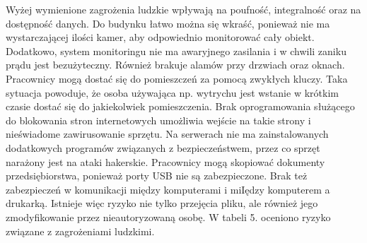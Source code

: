 Wyżej wymienione zagrożenia ludzkie wpływają na poufność, integralność oraz na dostępność danych. Do budynku łatwo można się wkraść, ponieważ nie ma wystarczającej ilości kamer, aby odpowiednio monitorować cały obiekt. Dodatkowo, system monitoringu nie ma awaryjnego zasilania i w chwili zaniku prądu jest bezużyteczny. Również brakuje alamów przy drzwiach oraz oknach. Pracownicy mogą dostać się do pomieszczeń za pomocą zwykłych kluczy. Taka sytuacja powoduje, że osoba używająca np. wytrychu jest wstanie w krótkim czasie dostać się do jakiekolwiek pomieszczenia. Brak oprogramowania służącego do blokowania stron internetowych umożliwia wejście na takie strony i nieświadome zawirusowanie sprzętu. Na serwerach nie ma zainstalowanych dodatkowych programów związanych z bezpieczeństwem, przez co sprzęt narażony jest na ataki hakerskie. Pracownicy mogą skopiować dokumenty przedsiębiorstwa, ponieważ porty USB nie są zabezpieczone. Brak też zabezpieczeń w komunikacji między komputerami i miIędzy komputerem a drukarką. Istnieje więc ryzyko nie tylko przejęcia pliku, ale również jego zmodyfikowanie przez nieautoryzowaną osobę.
W tabeli 5. oceniono ryzyko związane z zagrożeniami ludzkimi.

